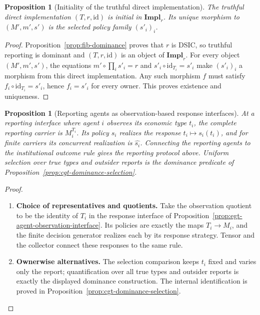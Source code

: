 \documentclass[11pt,a4paper]{article}
\numberwithin{equation}{section}
\newtheorem{proposition}[theorem]{Proposition}
\theoremstyle{definition}
\theoremstyle{remark}
\theoremstyle{plain}
\begin{document}
\begin{proposition}[Initiality of the truthful direct implementation]
\label{prop:egt-direct-implementation-initial}
The truthful direct implementation $(T,r,\mathrm{id})$ is initial in
$\mathbf{Impl}_r$. Its unique morphism to $(M',m',s')$ is the selected
policy family $(s'_i)_i$.
\end{proposition}
\begin{proof}
Proposition~\ref{prop:fib-dominance} proves that $r$ is DSIC, so truthful
reporting is dominant and $(T,r,\mathrm{id})$ is an object of
$\mathbf{Impl}_r$. For every object $(M',m',s')$, the equations
$m'\circ\prod_i s'_i=r$ and $s'_i\circ\mathrm{id}_{T_i}=s'_i$
make $(s'_i)_i$ a morphism from this direct implementation. Any such
morphism $f$ must satisfy $f_i\circ\mathrm{id}_{T_i}=s'_i$, hence
$f_i=s'_i$ for every owner. This proves existence and uniqueness.
\end{proof}

\begin{proposition}[Reporting agents as observation-based response interfaces]
\label{prop:egt-reporting-agent-interface}
At a reporting interface where agent $i$ observes its economic type $t_i$,
the complete reporting carrier is $M_i^{T_i}$. Its policy $s_i$ realizes the
response $t_i\mapsto s_i(t_i)$, and for finite carriers its concurrent
realization is $\widehat{s_i}$. Connecting the reporting agents to the
institutional outcome rule gives the reporting protocol above. Uniform
selection over true types and outsider reports is the dominance predicate
of Proposition~\ref{prop:cgt-dominance-selection}.
\end{proposition}
\begin{proof}
\leavevmode
\begin{enumerate}[label=\textup{(\arabic*)},leftmargin=*,itemsep=4pt,topsep=3pt]
  \item \textbf{Choice of representatives and quotients.} Take the observation quotient to be the identity of $T_i$ in the response
interface of Proposition~\ref{prop:egt-agent-observation-interface}. Its policies are
exactly the maps $T_i\to M_i$, and the finite decision generator realizes
each by its response strategy. Tensor and the collector connect these
responses to the same rule.
  \item \textbf{Ownerwise alternatives.} The selection comparison keeps $t_i$ fixed and
varies only the report; quantification over all true types and outsider
reports is exactly the displayed dominance construction. The internal
identification is proved in Proposition~\ref{prop:cgt-dominance-selection}.
\end{enumerate}
\end{proof}
\end{document}
